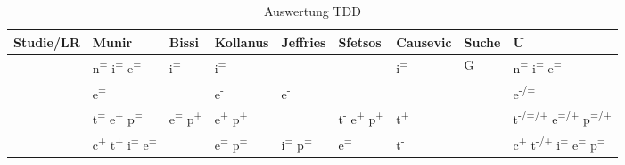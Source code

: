 \begin{table*}[p]
\begin{tabularx}{\textwidth}{@{}Xp{}p{}p{}p{}@{}}
\end{tabularx}
\end{table*}

\begin{table*}[ht]
\renewcommand{\arraystretch}{1.3}
\caption{Auswertung TDD}
\label{table:TDDAuswertungKomplett}
\centering
\begin{threeparttable}
\begin{tabularx}{\textwidth}{@{}lXXXXXXll@{}}
\toprule
Studie/LR                                & Munir \cite{Munir2014ConsideringReview} & Bissi \cite{Bissi2016TheReview} & Kollanus \cite{Kollanus2010Test-DrivenApproach} & Jeffries \cite{Jeffries2007TheProgramming} & Sfetsos \cite{Sfetsos2010EmpiricalReview} & Causevic \cite{Causevic2011FactorsReview} & Suche                & U                                                 \\ \midrule
\cite{Madeyski2010TheExperiment}         & n\textsuperscript{=} i\textsuperscript{=} e\textsuperscript{=}                    & i\textsuperscript{=}                          & i\textsuperscript{=}                                          &                                            &                                           & i\textsuperscript{=}                                    & G                    & n\textsuperscript{=} i\textsuperscript{=} e\textsuperscript{=}                              \\
\cite{Madeyski2005PreliminaryQuality}    & e\textsuperscript{=}                                  &                                 & e\textsuperscript{-}                                          & e\textsuperscript{-}                                     &                                           &                                           &                      & e\textsuperscript{-/=}                                          \\
\cite{Gupta2007AnDevelopment}            & t\textsuperscript{=} e\textsuperscript{+} p\textsuperscript{=}                    & e\textsuperscript{=} p\textsuperscript{+}                   & e\textsuperscript{+} p\textsuperscript{+}                                   &                                            & t\textsuperscript{-} e\textsuperscript{+} p\textsuperscript{+}                      & t\textsuperscript{+}                                    &                      & t\textsuperscript{-/=/+} e\textsuperscript{=/+} p\textsuperscript{=/+}                      \\
\cite{Muller2002ExperimentProgramming}   & c\textsuperscript{+} t\textsuperscript{+} i\textsuperscript{=} e\textsuperscript{=}             &                                 & e\textsuperscript{=} p\textsuperscript{=}                                   & i\textsuperscript{=} p\textsuperscript{=}                              & e\textsuperscript{=}                                    & t\textsuperscript{-}                                    &                      & c\textsuperscript{+} t\textsuperscript{-/+} i\textsuperscript{=} e\textsuperscript{=} p\textsuperscript{=}              \\

\end{tabularx}
\end{threeparttable}
\end{table*}
